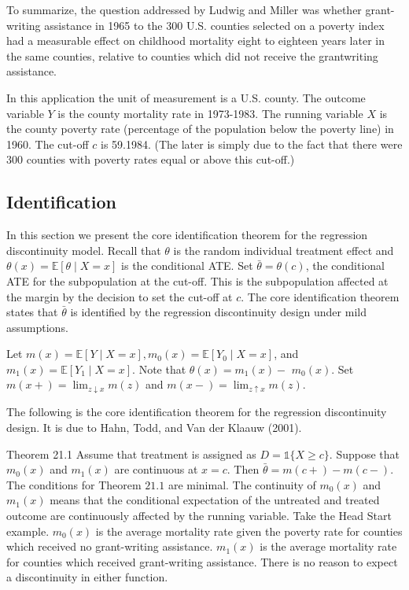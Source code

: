 \documentclass[10pt]{article}
\begin{document}
To summarize, the question addressed by Ludwig and Miller was whether grant-writing assistance in 1965 to the 300 U.S. counties selected on a poverty index had a measurable effect on childhood mortality eight to eighteen years later in the same counties, relative to counties which did not receive the grantwriting assistance.

In this application the unit of measurement is a U.S. county. The outcome variable $Y$ is the county mortality rate in 1973-1983. The running variable $X$ is the county poverty rate (percentage of the population below the poverty line) in 1960. The cut-off $c$ is 59.1984. (The later is simply due to the fact that there were 300 counties with poverty rates equal or above this cut-off.)

\subsection{Identification}
In this section we present the core identification theorem for the regression discontinuity model. Recall that $\theta$ is the random individual treatment effect and $\theta(x)=\mathbb{E}[\theta \mid X=x]$ is the conditional ATE. Set $\bar{\theta}=\theta(c)$, the conditional ATE for the subpopulation at the cut-off. This is the subpopulation affected at the margin by the decision to set the cut-off at $c$. The core identification theorem states that $\bar{\theta}$ is identified by the regression discontinuity design under mild assumptions.

Let $m(x)=\mathbb{E}[Y \mid X=x], m_{0}(x)=\mathbb{E}\left[Y_{0} \mid X=x\right]$, and $m_{1}(x)=\mathbb{E}\left[Y_{1} \mid X=x\right]$. Note that $\theta(x)=m_{1}(x)-$ $m_{0}(x)$. Set $m(x+)=\lim _{z \downarrow x} m(z)$ and $m(x-)=\lim _{z \uparrow x} m(z)$.

The following is the core identification theorem for the regression discontinuity design. It is due to Hahn, Todd, and Van der Klaauw (2001).

Theorem 21.1 Assume that treatment is assigned as $D=\mathbb{1}\{X \geq c\}$. Suppose that $m_{0}(x)$ and $m_{1}(x)$ are continuous at $x=c$. Then $\bar{\theta}=m(c+)-m(c-)$. The conditions for Theorem $21.1$ are minimal. The continuity of $m_{0}(x)$ and $m_{1}(x)$ means that the conditional expectation of the untreated and treated outcome are continuously affected by the running variable. Take the Head Start example. $m_{0}(x)$ is the average mortality rate given the poverty rate for counties which received no grant-writing assistance. $m_{1}(x)$ is the average mortality rate for counties which received grant-writing assistance. There is no reason to expect a discontinuity in either function.
\end{document}
